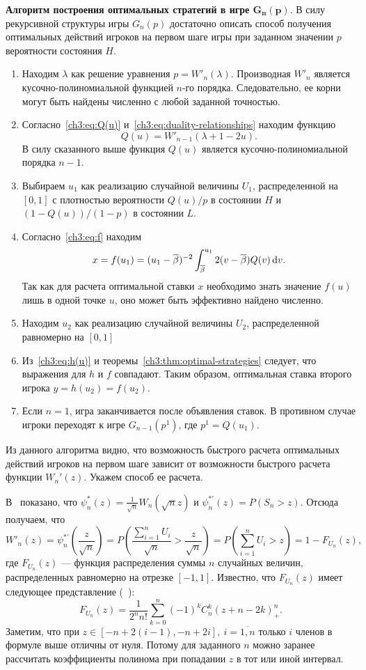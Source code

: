 {\noindent
\textbf{Алгоритм построения оптимальных стратегий в игре $\mathbf{G_n(p)}$}.
В силу рекурсивной структуры игры $G_n(p)$ достаточно описать способ получения оптимальных действий игроков на первом шаге игры при заданном значении $p$ вероятности состояния $H$.
\begin{enumerate}
\item
  Находим $\lambda$ как решение уравнения 
  $
    p = W'_n(\lambda).
  $
  Производная $W'_n$ является кусочно-полиномиальной функцией $n$-го порядка.
  Следовательно, ее корни могут быть найдены численно с любой заданной точностью.
\item
  Согласно~\eqref{ch3:eq:Q(u)} и~\eqref{ch3:eq:duality-relationships} находим функцию 
  \[
    Q(u) = W'_{n-1}(\lambda + 1 - 2u).
  \]
  В силу сказанного выше функция $Q(u)$ является кусочно-полиномиальной порядка $n-1$.
\item
  Выбираем $u_1$ как реализацию случайной величины $U_1$, распределенной на $[0, 1]$ с плотностью вероятности $Q(u)/p$ в состоянии $H$ и $\left(1 - Q(u)\right)/(1-p)$ в состоянии $L$.
\item
  Согласно~\eqref{ch3:eq:f} находим 
  \[
    x = f(u_1) = (u_1 - {{\overline{\beta}}})^{-2} \int_{{{\overline{\beta}}}}^{u_1} 2 (v - {{\overline{\beta}}}) Q(v) \mathop{}\!\mathrm{d} v.
  \]
  Так как для расчета оптимальной ставки $x$ необходимо знать значение $f(u)$ лишь в одной точке $u$, оно может быть эффективно найдено численно.
\item
  Находим $u_2$ как реализацию случайной величины $U_2$, распределенной равномерно на $[0, 1]$
\item
  Из~\eqref{ch3:eq:h(u)} и теоремы~\ref{ch3:thm:optimal-strategies} следует, что выражения для $h$ и $f$ совпадают.
  Таким образом, оптимальная ставка второго игрока $y = h(u_2) = f(u_2)$.
\item
  Если $n = 1$, игра заканчивается после объявления ставок. В противном случае игроки переходят к игре $G_{n-1}(p^1)$, где $p^1 = Q(u_1)$.
\end{enumerate}

Из данного алгоритма видно, что возможность быстрого расчета оптимальных действий игроков на первом шаге зависит от возможности быстрого расчета функции $W_n'(z)$.
Укажем способ ее расчета.

В~\cite{demeyer02} показано, что $\psi^*_n(z) = \frac{1}{\sqrt{n}} W_n(\sqrt{n} z)$ и $\psi^{*\prime}_n(z) = P(S_n > z)$.
Отсюда получаем, что
\[
  W'_n(z)
  = \psi^{*\prime}_n \left( \frac{z}{\sqrt{n}} \right) 
  = P\left( \frac{\sum_{i=1}^n U_i}{\sqrt{n}} > \frac{z}{\sqrt{n}} \right)
  = P\left( \sum_{i=1}^n U_i > z \right) 
  = 1 - F_{U_n}(z),
\]
где $F_{U_n}(z)$ --- функция распределения суммы $n$ случайных величин, распределенных равномерно на отрезке $[-1, 1]$.
Известно, что $F_{U_n}(z)$ имеет следующее представление (\seename~\cite{feller67}):
\[
  F_{U_n}(z) = \frac{1}{2^n n!} \sum_{k=0}^n (-1)^k C_n^k (z + n - 2k)^n_+.
\]
Заметим, что при $z \in [-n + 2(i-1), -n + 2i],\ i = \overline{1, n}$ только $i$ членов в формуле выше отличны от нуля.
Потому для заданного $n$ можно заранее рассчитать коэффициенты полинома при попадании $z$ в тот или иной интервал.

}
